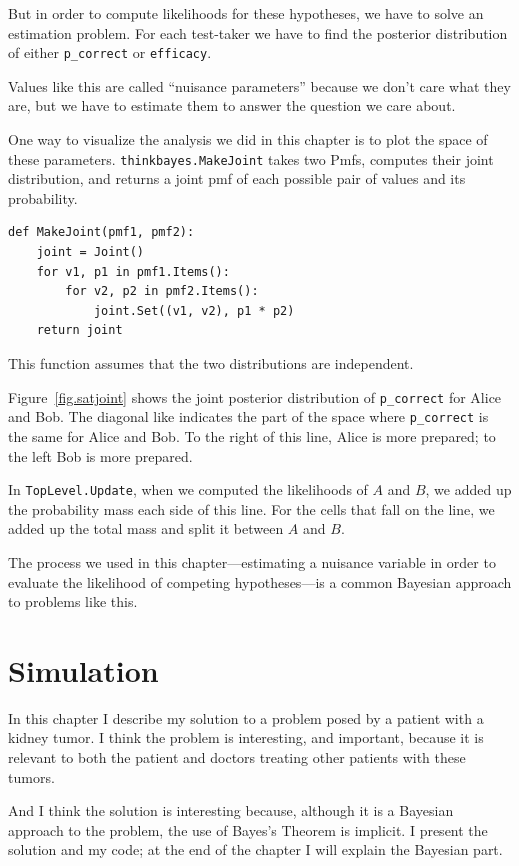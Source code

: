 \documentclass[12pt]{book}
\begin{document}
But in order to compute likelihoods for these hypotheses, we
have to solve an estimation problem.  For each test-taker
we have to find the posterior distribution of either
\verb"p_correct" or \verb"efficacy".

Values like this are called ``nuisance parameters'' because
we don't care what they are, but we have
to estimate them to answer the question we care about.

One way to visualize the analysis we did in this chapter is
to plot the space of these parameters.  \verb"thinkbayes.MakeJoint"
takes two Pmfs, computes their joint distribution, and returns
a joint pmf of each possible pair of values and its probability.

\begin{verbatim}
def MakeJoint(pmf1, pmf2):
    joint = Joint()
    for v1, p1 in pmf1.Items():
        for v2, p2 in pmf2.Items():
            joint.Set((v1, v2), p1 * p2)
    return joint
\end{verbatim}

This function assumes that the two distributions are independent.

Figure~\ref{fig.satjoint} shows the joint posterior distribution of
\verb"p_correct" for Alice and Bob.  The diagonal like indicates the
part of the space where \verb"p_correct" is the same for Alice and
Bob.  To the right of this line, Alice is more prepared; to the left
Bob is more prepared.

In {\tt TopLevel.Update}, when we computed the likelihoods of $A$ and
$B$, we added up the probability mass each side of this line.  For the
cells that fall on the line, we added up the total mass and split it
between $A$ and $B$.

The process we used in this chapter---estimating a nuisance
variable in order to evaluate the likelihood of competing
hypotheses---is a common Bayesian approach to problems like this.




\chapter{Simulation}

In this chapter I describe my solution to a problem posed
by a patient with a kidney tumor.  I think the problem is interesting,
and important, because it is relevant to both the patient and
doctors treating other patients with these tumors.

And I think the solution is interesting because, although it
is a Bayesian approach to the problem, the use of Bayes's Theorem
is implicit.  I present the solution and my code; at the end
of the chapter I will explain the Bayesian part.
\end{document}
